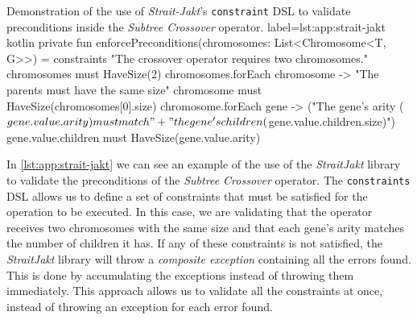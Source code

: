         \begin{code}{
            Demonstration of the use of \textit{Strait-Jakt}'s \texttt{constraint} DSL to validate preconditions inside the 
            \textit{Subtree Crossover} operator.
        }{
            label=lst:app:strait-jakt
        }{kotlin}
            private fun enforcePreconditions(chromosomes: List<Chromosome<T, G>>) = constraints {
                "The crossover operator requires two chromosomes." { chromosomes must HaveSize(2) }
                chromosomes.forEach { chromosome ->
                    "The parents must have the same size" { 
                        chromosome must HaveSize(chromosomes[0].size) 
                    }
                    chromosome.forEach { gene ->
                        ("The gene's arity (${gene.value.arity}) must match "
                            + "the gene's children (${gene.value.children.size})") {
                            gene.value.children must HaveSize(gene.value.arity)
                        }
                    }
                }
            }
        \end{code}

        In \vref{lst:app:strait-jakt} we can see an example of the use of the \textit{StraitJakt} library to validate 
        the preconditions of the \textit{Subtree Crossover} operator. The \texttt{constraints} DSL allows us to define a 
        set of constraints that must be satisfied for the operation to be executed. In this case, we are validating that 
        the operator receives two chromosomes with the same size and that each gene's arity matches the number of 
        children it has. If any of these constraints is not satisfied, the \textit{StraitJakt} library will throw a 
        \textit{composite exception} containing all the errors found. This is done by accumulating the exceptions
        instead of throwing them immediately. This approach allows us to validate all the constraints at once, instead
        of throwing an exception for each error found.
